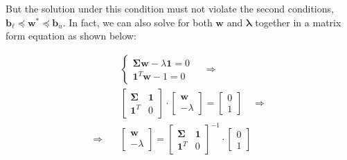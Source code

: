 \documentclass{beamer}
\begin{document}
\begin{frame}

\justifying
But the solution under this condition must not violate the second conditions, $\mathbf{b}_{\ell} \preccurlyeq \mathbf{w}^{*} \preccurlyeq \mathbf{b}_{u}$. In fact, we can also solve for both $\mathbf{w}$ and $\boldsymbol\lambda$ together in a matrix form equation as shown below:

\justifying
\begin{equation*}
\begin{aligned}
	& \begin{cases}
	\mathbf{\Sigma}\mathbf{w} - \lambda \mathbf{1} = 0 \\
	\mathbf{1}^{T}\mathbf{w} - 1 = 0
	\end{cases}
	\quad \Rightarrow \\
	& \begin{bmatrix}
		\mathbf{\Sigma} & \mathbf{1} \\
		\mathbf{1}^{T} & 0
	   \end{bmatrix}
	   \cdot
	   \begin{bmatrix}
	   	\mathbf{w} \\
		-\lambda
	  \end{bmatrix}
	  =
	  \begin{bmatrix}
	  	0 \\ 
		1
	\end{bmatrix}
	\quad \Rightarrow \\
	\Rightarrow \quad &
	\begin{bmatrix}
	   	\mathbf{w} \\
		-\lambda
	  \end{bmatrix}
	  =
	  \begin{bmatrix}
		\mathbf{\Sigma} & \mathbf{1} \\
		\mathbf{1}^{T} & 0
	   \end{bmatrix}^{-1}
	  \cdot
	  \begin{bmatrix}
	  	0 \\ 
		1
	\end{bmatrix}
\end{aligned}
\end{equation*}


\end{frame}
\end{document}
